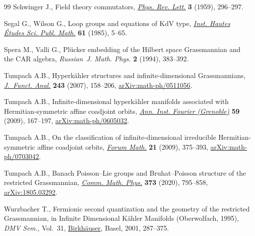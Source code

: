 \documentclass[10pt,a4paper]{amsart}
\theoremstyle{definition}
\numberwithin{equation}{section}
\begin{document}
\begin{thebibliography}{99}
Schwinger J., Field theory commutators, \href{https://doi.org/10.1103/PhysRevLett.3.296}{\textit{Phys. Rev. Lett.}} \textbf{3}
 (1959), 296--297.

Segal G., Wilson G., Loop groups and equations of {K}d{V} type, \href{https://doi.org/10.1007/BF02698802}{\textit{Inst.
 Hautes \'Etudes Sci. Publ. Math.}} \textbf{61} (1985), 5--65.

Spera M., Valli G., Pl\"ucker embedding of the {H}ilbert space {G}rassmannian
 and the {CAR} algebra, \textit{Russian~J. Math. Phys.} \textbf{2} (1994),
 383--392.

Tumpach A.B., Hyperk\"ahler structures and infinite-dimensional
 {G}rassmannians, \href{https://doi.org/10.1016/j.jfa.2006.05.019}{\textit{J.~Funct. Anal.}} \textbf{243} (2007), 158--206,
 \href{https://arxiv.org/abs/math-ph/0511056}{arXiv:math-ph/0511056}.

Tumpach A.B., Infinite-dimensional hyperk\"ahler manifolds associated with
 {H}ermitian-symmetric affine coadjoint orbits, \href{https://doi.org/10.5802/aif.2428}{\textit{Ann. Inst. Fourier
 (Grenoble)}} \textbf{59} (2009), 167--197, \href{https://arxiv.org/abs/math-ph/0605032}{arXiv:math-ph/0605032}.

Tumpach A.B., On the classification of infinite-dimensional irreducible
 {H}ermitian-symmetric affine coadjoint orbits, \href{https://doi.org/10.1515/FORUM.2009.018}{\textit{Forum Math.}}
 \textbf{21} (2009), 375--393, \href{https://arxiv.org/abs/math-ph/0703042}{arXiv:math-ph/0703042}.

Tumpach A.B., Banach {P}oisson--{L}ie groups and {B}ruhat--{P}oisson structure
 of the restricted {G}rassmannian, \href{https://doi.org/10.1007/s00220-019-03674-3}{\textit{Comm. Math. Phys.}} \textbf{373}
 (2020), 795--858, \href{https://arxiv.org/abs/1805.03292}{arXiv:1805.03292}.

Wurzbacher T., Fermionic second quantization and the geometry of the restricted
 {G}rassmannian, in Infinite {D}imensional {K}\"ahler {M}anifolds
 ({O}berwolfach, 1995), \textit{DMV Sem.}, Vol.~31, \href{https://doi.org/10.1007/978-3-0348-8227-9_6}{Birkh\"auser}, Basel, 2001,
 287--375.

\end{thebibliography}
\end{document}
